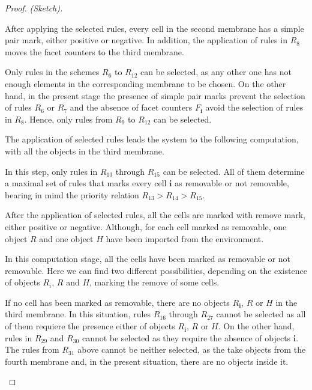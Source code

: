 \documentclass[journal]{IEEEtran}
\begin{document}
\begin{proof} {\it (Sketch).}
\begin{list}{\textbf{Step }}{}
After applying the selected rules, every cell in the second membrane has a
simple pair mark, either positive or negative. In addition, the application of
rules in $R_8$ moves the facet counters to the third membrane.
\item Only rules in the schemes $R_6$ to $R_{12}$ can
be selected, as any other one has not enough elements in the corresponding
membrane to be chosen. On the other hand, in the present stage the presence of
simple pair marks prevent the selection of rules $R_6$ or $R_7$ and the absence
of facet counters $F_\mathbf{i}$ avoid the selection of rules in $R_8$. Hence,
only rules from $R_9$ to $R_{12}$ can be selected.

The application of selected rules leads the system to the following computation,
with all the objects in the third membrane.
\item In this step, only rules in $R_{13}$ through $R_{15}$ can be selected. All
of them determine a maximal set of rules that marks every cell $\mathbf{i}$ as
removable or not removable, bearing in mind the priority relation $R_{13} >
R_{14} > R_{15}$.

After the application of selected rules, all the cells are marked with remove
mark, either positive or negative. Although, for each cell marked as removable,
one object $R$ and one object $H$ have been imported from the environment.
\item In this computation stage, all the cells have been marked as removable or
not removable. Here we can find two different possibilities, depending on the
existence of objects $R_i$, $R$ and $H$, marking the remove of some cells.
\begin{list}{)}{}
\item If no cell has been marked as removable, there are no objects
$R_\mathbf{i}$, $R$ or $H$ in the third membrane. In this situation, rules
$R_{16}$ through $R_{27}$ cannot be selected as all of them requiere the
presence either of objects $R_\mathbf{i}$, $R$ or $H$. On the other hand, rules
in $R_{29}$ and $R_{30}$ cannot be selected as they require the absence of
objects $\mathbf{i}$. The rules from $R_{31}$ above cannot be neither selected,
as the take objects from the fourth membrane and, in the present situation,
there are no objects inside it.


\end{list}
\end{list}
\end{proof}
\end{document}
